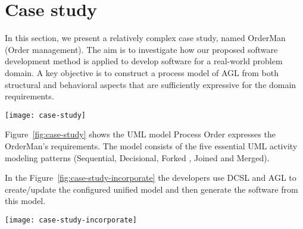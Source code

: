 \section{Case study}
\label{sect:case-study} %

In this section, we present a relatively complex case study, named OrderMan (Order management). The aim is to investigate how our proposed software development method is applied to develop software for a real-world problem domain. A key objective is to construct a process model of AGL from both structural and behavioral aspects that are sufficiently expressive for the domain requirements. 
\begin{figure*}[ht]
	\centering
	\texttt{[image: case-study]}
	\caption{the Process Order} %
	\label{fig:case-study}
\end{figure*}


Figure~\ref{fig:case-study} shows the UML model Process Order expresses the OrderMan’s requirements. The model consists of the five essential UML activity modeling patterns (Sequential, Decisional, Forked , Joined and Merged).


In the Figure~\ref{fig:case-study-incorporate} the developers use DCSL and AGL to create/update the configured unified model and then generate the software from this model.
\begin{figure*}[ht]
	\centering
	\texttt{[image: case-study-incorporate]}
	\caption{(LHS) The the unified model; (RHS) The Node objects, Edge objects of the activity graph and ModuleAct objects that are referenced by the Nodes} %
	\label{fig:case-study-incorporate}
\end{figure*}